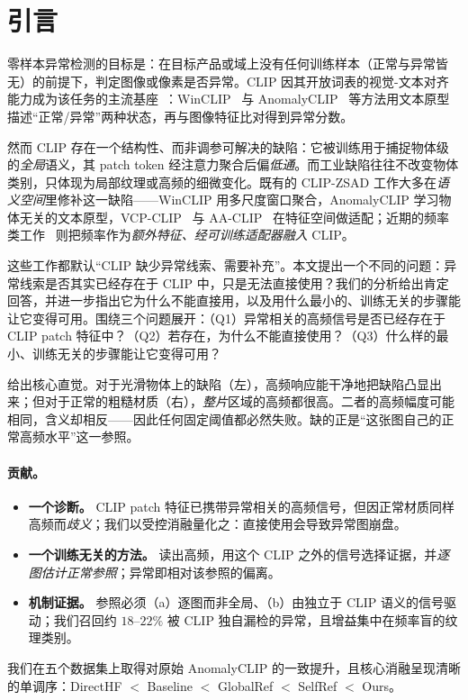 \section{引言}
\label{sec:intro}

零样本异常检测的目标是：在目标产品或域上没有任何训练样本（正常与异常皆无）的前提下，判定图像或像素是否异常。CLIP 因其开放词表的视觉-文本对齐能力成为该任务的主流基座~\cite{radford2021clip}：WinCLIP~\cite{jeong2023winclip} 与 AnomalyCLIP~\cite{zhou2024anomalyclip} 等方法用文本原型描述“正常/异常”两种状态，再与图像特征比对得到异常分数。

然而 CLIP 存在一个结构性、而非调参可解决的缺陷：它被训练用于捕捉物体级的\emph{全局}语义，其 patch token 经注意力聚合后偏\emph{低通}。而工业缺陷往往不改变物体类别，只体现为局部纹理或高频的细微变化。既有的 CLIP-ZSAD 工作大多在\emph{语义空间}里修补这一缺陷——WinCLIP 用多尺度窗口聚合，AnomalyCLIP 学习物体无关的文本原型，VCP-CLIP~\cite{qu2024vcpclip} 与 AA-CLIP~\cite{ma2025aaclip} 在特征空间做适配；近期的频率类工作~\cite{gong2025feclip} 则把频率作为\emph{额外特征、经可训练适配器融入} CLIP。

这些工作都默认“CLIP 缺少异常线索、需要补充”。本文提出一个不同的问题：异常线索是否其实已经存在于 CLIP 中，只是无法直接使用？我们的分析给出肯定回答，并进一步指出它为什么不能直接用，以及用什么最小的、训练无关的步骤能让它变得可用。围绕三个问题展开：（Q1）异常相关的高频信号是否已经存在于 CLIP patch 特征中？（Q2）若存在，为什么不能直接使用？（Q3）什么样的最小、训练无关的步骤能让它变得可用？

 给出核心直觉。对于光滑物体上的缺陷（左），高频响应能干净地把缺陷凸显出来；但对于正常的粗糙材质（右），\emph{整片}区域的高频都很高。二者的高频幅度可能相同，含义却相反——因此任何固定阈值都必然失败。缺的正是“这张图自己的正常高频水平”这一参照。



\paragraph{贡献。}
\begin{itemize}[leftmargin=1.4em,itemsep=0.15em,topsep=0.2em]
\item \textbf{一个诊断。} CLIP patch 特征已携带异常相关的高频信号，但因正常材质同样高频而\emph{歧义}；我们以受控消融量化之：直接使用会导致异常图崩盘。
\item \textbf{一个训练无关的方法。} 读出高频，用这个 CLIP 之外的信号选择证据，并\emph{逐图估计正常参照}；异常即相对该参照的偏离。
\item \textbf{机制证据。} 参照必须（a）逐图而非全局、（b）由独立于 CLIP 语义的信号驱动；我们召回约 $18\text{--}22\%$ 被 CLIP 独自漏检的异常，且增益集中在频率盲的纹理类别。
\end{itemize}

我们在五个数据集上取得对原始 AnomalyCLIP 的一致提升，且核心消融呈现清晰的单调序：DirectHF $<$ Baseline $<$ GlobalRef $<$ SelfRef $<$ Ours。

